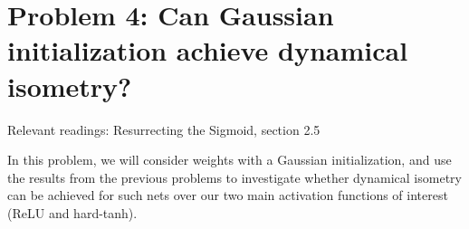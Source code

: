 \documentclass[a4paper]{article}
\begin{document}
\section*{Problem 4: Can Gaussian initialization achieve dynamical isometry?}

Relevant readings:
Resurrecting the Sigmoid, section 2.5


In this problem, we will consider weights with a Gaussian initialization, and use the results from the previous problems to investigate whether dynamical isometry can be achieved for such nets over our two main activation functions of interest (ReLU and hard-tanh).
\end{document}
